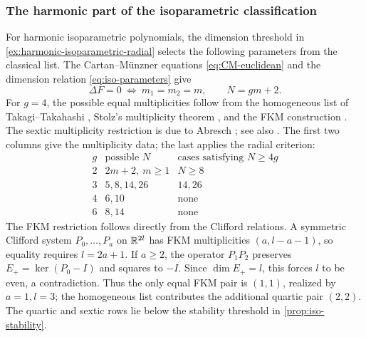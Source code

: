 \subsubsection{The harmonic part of the isoparametric classification}
\label{sec:harmonic-isoparametric-scope}

For harmonic isoparametric polynomials, the dimension threshold in
\cref{ex:harmonic-isoparametric-radial} selects the following
parameters from the classical list.
The Cartan--M\"unzner equations \eqref{eq:CM-euclidean} and the
dimension relation \eqref{eq:iso-parameters} give
\[
 \Delta F=0\ \Longleftrightarrow\ m_1=m_2=m,
 \qquad N=gm+2.
\]
For \(g=4\), the possible equal multiplicities follow from the
homogeneous list of Takagi--Takahashi \cite{TakagiTakahashi72},
Stolz's multiplicity theorem \cite{Stolz99}, and the FKM construction
\cite[Theorem~4.1]{FKM81}. The sextic multiplicity restriction is due
to Abresch \cite{Abresch83}; see also
\cite[Chapter~3]{CecilRyan15}.
The first two columns give the multiplicity data; the last applies
the radial criterion:
\[
\begin{array}{c|c|c}
 g&\text{possible }N&\text{cases satisfying }N\ge4g\\ \hline
 2&2m+2,\ m\ge1&N\ge8\\
 3&5,8,14,26&14,26\\
 4&6,10&\text{none}\\
 6&8,14&\text{none}
\end{array}
\]
The FKM restriction follows directly from the Clifford relations.
A symmetric Clifford system
\(P_0,\ldots,P_a\) on \(\mathbb R^{2l}\) has FKM multiplicities
\((a,l-a-1)\), so equality requires \(l=2a+1\).
If \(a\ge2\), the operator \(P_1P_2\) preserves
\(E_+=\ker(P_0-I)\) and squares to \(-I\). Since
\(\dim E_+=l\), this forces \(l\) to be even, a contradiction.
Thus the only equal FKM pair is \((1,1)\), realized by
\(a=1,l=3\); the homogeneous list contributes the additional
quartic pair \((2,2)\). The quartic and sextic rows lie below the stability threshold in
\cref{prop:iso-stability}.
